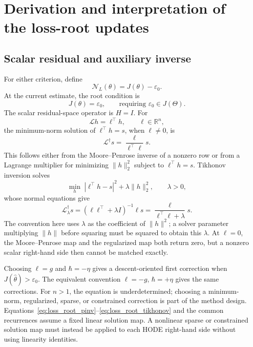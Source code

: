 \section{Derivation and interpretation of the loss-root updates}
\label{app:gotham_loss_updates}

\subsection{Scalar residual and auxiliary inverse}

For either criterion, define
\begin{equation}
\label{eq:loss_root_operator}
    \mathcal N_L(\theta)=J(\theta)-\varepsilon_0.
\end{equation}
At the current estimate, the root condition is
\begin{equation}
\label{eq:loss_root_condition}
    J(\theta)=\varepsilon_0,
    \qquad\text{requiring }\varepsilon_0\in J(\Theta).
\end{equation}
The scalar residual-space operator is $H=I$. For
\begin{equation}
\label{eq:loss_root_aux_operator}
    \mathcal Lh=\ell^\top h,\qquad \ell\in\mathbb R^n,
\end{equation}
the minimum-norm solution of $\ell^\top h=s$, when $\ell\ne0$, is
\begin{equation}
\label{eq:loss_root_pinv}
    \mathcal L^\dagger s=\frac{\ell}{\ell^\top\ell}s.
\end{equation}
This follows either from the Moore--Penrose inverse of a nonzero row
or from a Lagrange multiplier for minimizing $\|h\|_2^2$ subject to
$\ell^\top h=s$. Tikhonov inversion solves
\begin{equation}
\label{eq:loss_root_tikhonov_problem}
    \min_h\;|\ell^\top h-s|^2+\lambda\|h\|_2^2,
    \qquad\lambda>0,
\end{equation}
whose normal equations give
\begin{equation}
\label{eq:loss_root_tikhonov}
    \mathcal L^\dagger_\lambda s
    =(\ell\ell^\top+\lambda I)^{-1}\ell s
    =\frac{\ell}{\ell^\top\ell+\lambda}s.
\end{equation}
The convention here uses $\lambda$ as the coefficient of $\|h\|^2$;
a solver parameter multiplying $\|h\|$ before squaring must be squared
to obtain this $\lambda$. At $\ell=0$, the Moore--Penrose map and the
regularized map both return zero, but a nonzero scalar right-hand side
then cannot be matched exactly.

Choosing $\ell=g$ and $\hbar=-\eta$ gives a descent-oriented
first correction when $J(\hat\theta)>\varepsilon_0$. The equivalent
convention $\ell=-g$, $\hbar=+\eta$ gives the same corrections.
For $n>1$, the equation is underdetermined; choosing a minimum-norm,
regularized, sparse, or constrained correction is part of the method
design. Equations~\eqref{eq:loss_root_pinv}--\eqref{eq:loss_root_tikhonov}
and the common recurrences assume a fixed linear solution map. A
nonlinear sparse or constrained solution map must instead be applied
to each HODE right-hand side without using linearity identities.

